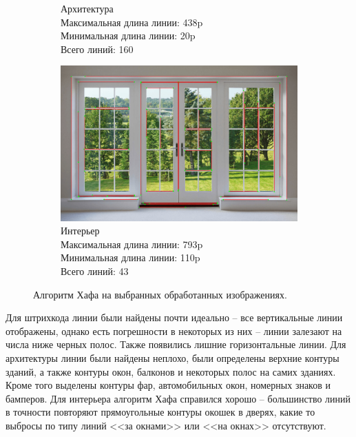 \documentclass[a4paper, 16pt]{article}
\begin{document}
\begin{figure}[htbp]
\begin{subfigure}{0.3\textwidth}
            \caption{Архитектура\\Максимальная длина линии: 438p\\Минимальная длина линии: 20p\\Всего линий: 160}
            \label{fig:canny_hl_i2}
        \end{subfigure}
        \hfill
        \begin{subfigure}{0.3\textwidth}
            \centering
            \includegraphics[width=\linewidth]{canny_hl_i3.png}
            \caption{Интерьер\\Максимальная длина линии: 793p\\Минимальная длина линии: 110p\\Всего линий: 43}
            \label{fig:canny_hl_i3}
        \end{subfigure}
        \caption{Алгоритм Хафа на выбранных обработанных изображениях.}
        \label{fig:canny_hl_is}
    \end{figure}


    \noindent Для штрихкода линии были найдены почти идеально -- все вертикальные линии отображены, однако есть погрешности
    в некоторых из них -- линии залезают на числа ниже черных полос. Также появились лишние горизонтальные линии. Для архитектуры
    линии были найдены неплохо, были определены верхние контуры зданий, а также контуры окон, балконов и некоторых полос на самих зданиях.
    Кроме того выделены контуры фар, автомобильных окон, номерных знаков и бамперов. Для интерьера алгоритм Хафа справился хорошо --
    большинство линий в точности повторяют прямоугольные контуры окошек в дверях, какие то выбросы по типу линий <<за окнами>> или
    <<на окнах>> отсутствуют.
\end{document}
